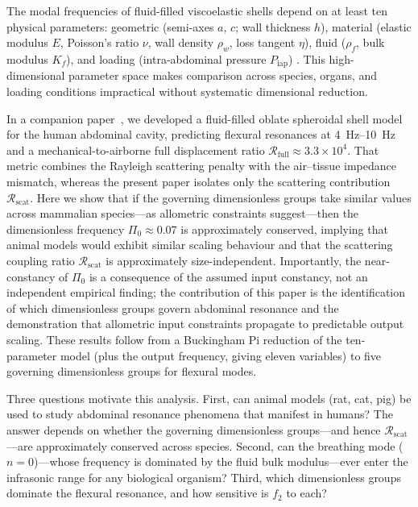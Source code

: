 \documentclass[review]{elsarticle}
\begin{document}
The modal frequencies of fluid-filled viscoelastic shells depend on at
least ten physical parameters: geometric (semi-axes $a$, $c$; wall
thickness $h$), material (elastic modulus $E$, Poisson's ratio $\nu$,
wall density $\rho_w$, loss tangent $\eta$), fluid ($\rho_f$, bulk
modulus $K_f$), and loading (intra-abdominal pressure $P_\mathrm{iap}$)
\cite{Soedel2004,Leissa1973,Junger1986,Junger1952,Lamb1882,Warburton1976}.  This high-dimensional
parameter space makes comparison across species, organs, and loading
conditions impractical without systematic dimensional reduction.

In a companion paper~\cite{Mace2026browntone}, we developed a fluid-filled
oblate spheroidal shell model for the human abdominal cavity, predicting
flexural resonances at \SIrange{4}{10}{\hertz} and a mechanical-to-airborne
full displacement ratio $\mathcal{R}_\mathrm{full} \approx 3.3 \times 10^4$.
That metric combines the Rayleigh scattering penalty with the air--tissue
impedance mismatch, whereas the present paper isolates only the
scattering contribution $\mathcal{R}_\mathrm{scat}$.  Here we show that
if the governing dimensionless groups take similar values across mammalian
species---as allometric constraints suggest---then the dimensionless
frequency $\Pi_0 \approx 0.07$ is approximately conserved, implying that
animal models would exhibit similar scaling behaviour and that the
scattering coupling ratio $\mathcal{R}_\mathrm{scat}$ is
approximately size-independent.  Importantly, the near-constancy of $\Pi_0$
is a consequence of the assumed input constancy, not an independent empirical
finding; the contribution of this paper is the identification of which
dimensionless groups govern abdominal resonance and the demonstration that
allometric input constraints propagate to predictable output scaling.
These results follow from a Buckingham Pi
reduction of the ten-parameter model (plus the output frequency,
giving eleven variables) to five governing dimensionless
groups for flexural modes.

Three questions motivate this analysis.  First, can animal models (rat, cat,
pig) be used to study abdominal resonance phenomena that manifest in humans?
The answer depends on whether the governing dimensionless groups---and hence
$\mathcal{R}_\mathrm{scat}$---are approximately conserved across species.  Second, can the
breathing mode ($n = 0$)---whose frequency is dominated by the fluid bulk
modulus---ever enter the infrasonic range for any biological organism?
Third, which dimensionless groups dominate the flexural resonance, and how
sensitive is $f_2$ to each?
\end{document}
